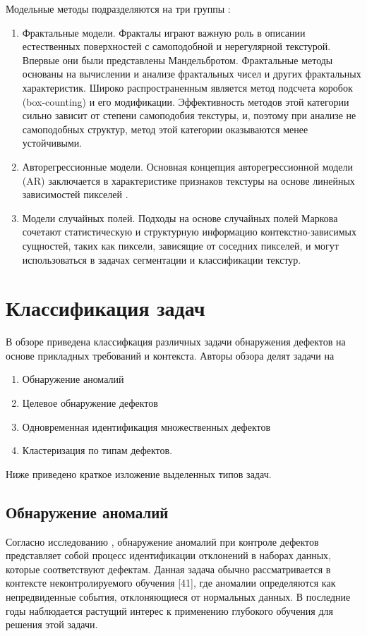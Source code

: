 \documentclass[14pt,a4paper]{article}
\begin{document}
Модельные методы подразделяются на три группы \cite{Czimmermann2020}:
\begin{enumerate}
	\item Фрактальные модели. Фракталы играют важную роль в описании естественных поверхностей с самоподобной и нерегулярной текстурой. Впервые они были представлены Мандельбротом. Фрактальные методы основаны на вычислении и анализе фрактальных чисел и других фрактальных характеристик. Широко распространенным является метод подсчета коробок (box-counting) и его модификации. Эффективность методов этой категории сильно зависит от степени самоподобия текстуры, и, поэтому при анализе не самоподобных структур, метод этой категории оказываются менее устойчивыми.
	\item Авторегрессионные модели. Основная концепция авторегрессионной модели (AR) заключается в характеристике признаков текстуры на основе линейных зависимостей пикселей \cite{Czimmermann2020}.
	\item Модели случайных полей. Подходы на основе случайных полей Маркова сочетают статистическую и структурную информацию контекстно-зависимых сущностей, таких как пиксели, зависящие от соседних пикселей, и могут использоваться в задачах сегментации и классификации текстур.
\end{enumerate}

\section{Классификация задач} %

В обзоре \cite{Bhatt2021} приведена классифкация различных задачи обнаружения дефектов на основе прикладных требований и контекста. Авторы обзора делят задачи на
\begin{enumerate}
	\item Обнаружение аномалий
	\item Целевое обнаружение дефектов
	\item Одновременная идентификация множественных дефектов
	\item Кластеризация по типам дефектов. 
\end{enumerate}
Ниже приведено краткое изложение выделенных типов задач.

\subsection{Обнаружение аномалий}
Согласно исследованию \cite{Bhatt2021}, обнаружение аномалий при контроле дефектов представляет собой процесс идентификации отклонений в наборах данных, которые соответствуют дефектам. Данная задача обычно рассматривается в контексте неконтролируемого обучения [41], где аномалии определяются как непредвиденные события, отклоняющиеся от нормальных данных. В последние годы наблюдается растущий интерес к применению глубокого обучения для решения этой задачи.
\end{document}
